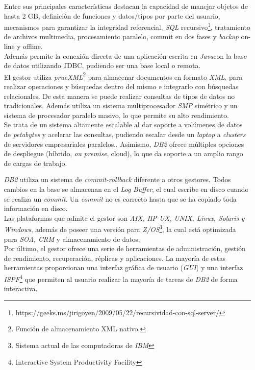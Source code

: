 \documentclass[11pt,a4paper]{article}
\begin{document}
Entre sus principales características destacan la capacidad de manejar objetos de hasta 2 GB, definición de funciones y datos/tipos por parte del usuario, mecanismos para garantizar la integridad referencial, \emph{SQL} recursivo\footnote{https://geeks.ms/jirigoyen/2009/05/22/recursividad-con-sql-server/}, tratamiento de archivos multimedia, procesamiento paralelo, commit en dos fases y \emph{backup} on-line y offline.\\
Además permite la conexión directa de una aplicación escrita en \emph{Java}con la base de datos utilizando JDBC,  pudiendo ser una base local o remota.\cite{DB2:3}\\

El gestor utiliza \emph{prueXML}\footnote{Función de almacenamiento XML nativo.} para almacenar documentos en formato \emph{XML}, para realizar operaciones y búsquedas dentro del mismo e integrarlo con búsquedas relacionales.\cite{WIKI:16} De esta manera se puede realizar consultas de tipos de datos no tradicionales. Además utiliza un sistema multiprocesador \emph{SMP} simétrico y un sistema de procesador paralelo masivo, lo que permite su alto rendimiento. \\

Se trata de un sistema altamente escalable al dar soporte a volúmenes de datos de \emph{petabytes} y acelerar las consultas, pudiendo escalar desde un \emph{laptop} a \emph{clusters} de servidores empresariales paralelos.\cite{DB2:4}.
Asimismo, \emph{DB2} ofrece múltiples opciones de despliegue (híbrido, \emph{on premise}, cloud), lo que da soporte a un amplio rango de cargas de trabajo.

\emph{DB2} utiliza un sistema de \emph{commit-rollback} diferente a otros gestores. Todos cambios en la base se almacenan en el \emph{Log Buffer}, el cual escribe en disco cuando se realiza un \emph{commit}. Un \emph{commit} no es correcto hasta que se ha copiado toda información en disco.\cite{DB2:5}\\

Las plataformas que admite el gestor son \emph{AIX, HP-UX, UNIX, Linux, Solaris y Windows}, además de poseer una versión para \emph{Z/OS}\footnote{Sistema actual de las computadoras de \emph{IBM}}, la cual está optimizada para \emph{SOA, CRM} y almacenamiento de datos.\cite{DB2:6}\\

Por último, el gestor ofrece una serie de herramientas de administración, gestión de rendimiento, recuperación, réplicas y aplicaciones. La mayoría de estas herramientas proporcionan una interfaz gráfica de usuario (\emph{GUI}) y una interfaz \emph{ISPF}\footnote{Interactive System Productivity Facility} que permiten al usuario realizar la mayoría de tareas de \emph{DB2} de forma interactiva.\cite{DB2:7}

\newpage



\end{document}
